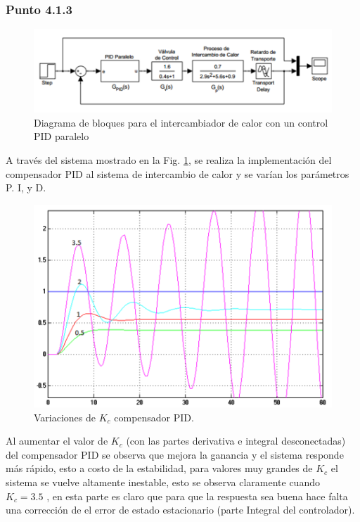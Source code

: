 \documentclass[twocolumn]{IEEEtran}
\begin{document}
\subsubsection{Punto 4.1.3}
\noindent
\begin{figure}[H]
	\centering
		\includegraphics[scale=0.27]{tf13.png}
	\caption{Diagrama de bloques para el intercambiador de calor con un control PID paralelo}
	\label{fig16}
\end{figure}
\noindent
A través del sistema mostrado en la Fig. \ref{fig16}, se realiza la implementación del compensador PID al sistema de intercambio de calor y se varían los parámetros P. I, y D. 
\begin{figure}[H]
	\centering
		\includegraphics[scale=0.27]{kvariante.png}
	\caption{Variaciones de $K_c$ compensador PID.}
	\label{fig17}
\end{figure}
\noindent
Al aumentar el valor de $K_c$ (con las partes derivativa e integral desconectadas) del compensador PID se observa que mejora la ganancia y el sistema responde más rápido, esto a costo de la estabilidad, para valores muy grandes de $K_c$ el sistema se vuelve altamente inestable, esto se observa claramente cuando $K_c=3.5$ , en esta parte es claro que para que la respuesta sea buena hace falta una corrección de el error de estado estacionario (parte Integral del controlador).
\end{document}
